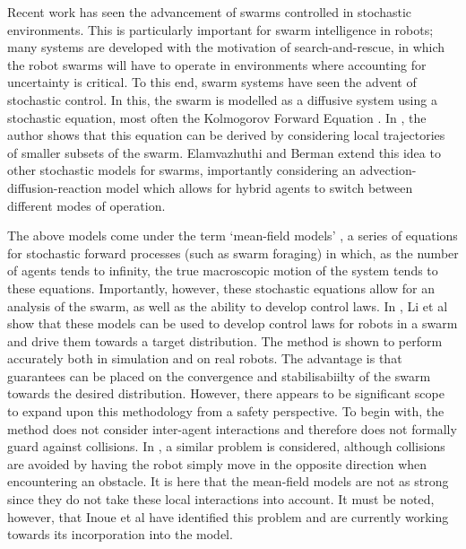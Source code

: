 \documentclass[../sample.tex]{subfiles}
\begin{document}

Recent work has seen the advancement of swarms controlled in stochastic environments. This is
particularly important for swarm intelligence in robots; many systems are developed with the
motivation of search-and-rescue, in which the robot swarms will have to operate in environments
where accounting for uncertainty is critical. To this end, swarm systems have seen the advent of
stochastic control. In this, the swarm is modelled as a diffusive system using a stochastic
equation, most often the Kolmogorov Forward Equation \cite{Hamann2008}. In \cite{Hamann2008}, the author shows that this equation can be derived by considering local trajectories of
smaller subsets of the swarm. Elamvazhuthi and Berman \cite{Elamvazhuthi2019} extend this idea to other
stochastic models for swarms, importantly considering an advection-diffusion-reaction model which
allows for hybrid agents to switch between different modes of operation. 

The above models come under the term ‘mean-field models’ \cite{Elamvazhuthi2019b}, a series of
equations
for stochastic forward processes (such as swarm foraging) in which, as the number of agents tends to
infinity, the true macroscopic motion of the system tends to these equations. Importantly, however,
these stochastic equations allow for an analysis of the swarm, as well as the ability to develop
control laws. In \cite{Li2017}, Li et al show that these models can be used to develop control
laws for robots in a swarm and drive them towards a target distribution. The method is shown to
perform accurately both in simulation and on real robots. The advantage is that guarantees can be
placed on the convergence and stabilisabiilty of the swarm towards the desired distribution.
However, there appears to be significant scope to expand upon this methodology from a safety
perspective. To begin with, the method does not consider inter-agent interactions and therefore does
not formally guard against collisions. In \cite{Inoue2019}, a similar problem is considered,
although collisions are avoided by having the robot simply move in the opposite direction when
encountering an obstacle. It is here that the mean-field models are not as strong since they do not
take these local interactions into account. It must be noted, however, that Inoue et al have
identified this problem and are currently working towards its incorporation into the model.
\end{document}
